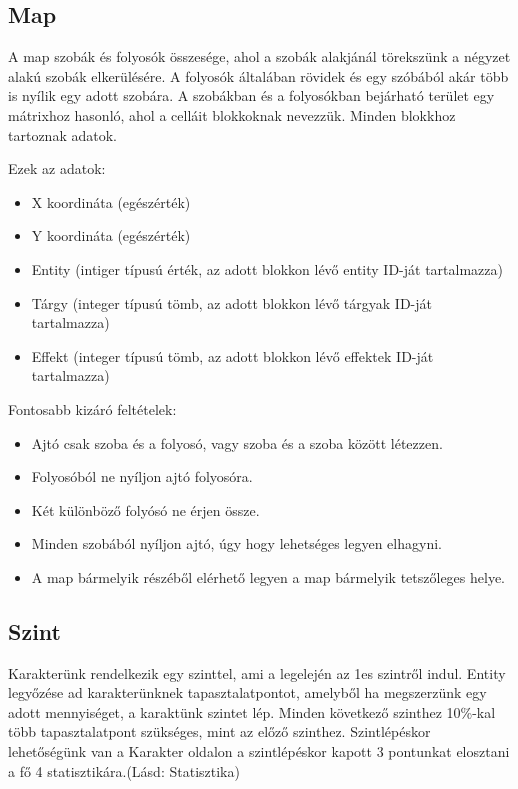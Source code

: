 \subsection{Map}

A map szobák és folyosók összesége, ahol a szobák alakjánál törekszünk a négyzet alakú szobák elkerülésére. A folyosók általában rövidek és egy szóbából akár több is nyílik egy adott szobára.
A szobákban és a folyosókban bejárható terület egy mátrixhoz hasonló, ahol a celláit blokkoknak nevezzük.
Minden blokkhoz tartoznak adatok.

\noindent Ezek az adatok:

\begin{itemize}
    \item X koordináta (egészérték)
    \item Y koordináta (egészérték)
    \item Entity (intiger típusú érték,  az adott blokkon lévő entity ID-ját tartalmazza)
    \item Tárgy (integer típusú tömb, az adott blokkon lévő tárgyak ID-ját tartalmazza)
    \item Effekt (integer típusú tömb, az adott blokkon lévő effektek ID-ját tartalmazza)
\end{itemize}

\noindent Fontosabb kizáró feltételek:

\begin{itemize}
    \item Ajtó csak szoba és a folyosó, vagy szoba és a szoba között létezzen.
    \item Folyosóból ne nyíljon ajtó folyosóra.
    \item Két különböző folyósó ne érjen össze.
    \item Minden szobából nyíljon ajtó, úgy hogy lehetséges legyen elhagyni.
    \item A map bármelyik részéből elérhető legyen a map bármelyik tetszőleges helye.
\end{itemize}


\subsection{Szint}

Karakterünk rendelkezik egy szinttel, ami a legelején az 1es szintről indul.
Entity legyőzése ad karakterünknek tapasztalatpontot, amelyből ha megszerzünk egy adott mennyiséget, a karaktünk szintet lép.
Minden következő szinthez 10\%-kal több tapasztalatpont szükséges, mint az előző szinthez.
Szintlépéskor lehetőségünk van a Karakter oldalon a szintlépéskor kapott 3 pontunkat elosztani a fő 4 statisztikára.(Lásd: Statisztika)

